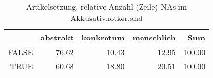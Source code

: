\begin{table}[ht]
\centering
\begin{tabular}{rrrrr}
  \hline
 & abstrakt & konkretum & menschlich & Sum \\ 
  \hline
FALSE & 76.62 & 10.43 & 12.95 & 100.00 \\ 
  TRUE & 60.68 & 18.80 & 20.51 & 100.00 \\ 
   \hline
\end{tabular}
\caption{Artikelsetzung, relative Anzahl (Zeile) NAs im Akkusativnotker.ahd} 
\end{table}
